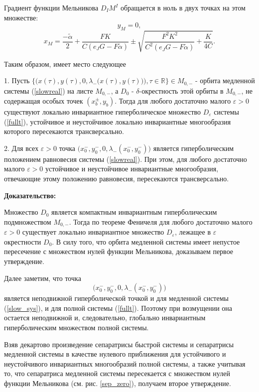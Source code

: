 Градиент функции Мельникова $D_IM^I$ обращается в ноль в двух точках на этом множестве:
$$y_M = 0,$$
$$x_M = \frac{-\tilde \alpha}{2}+\frac{FK}{C(e_JG-F \tilde \alpha)} \pm \sqrt{\frac{F^2 K^2}{C^2(e_JG-F \tilde \alpha)}+\frac{K}{4C}}.$$

Таким образом, имеет место следующее
\begin{utv}


1. Пусть $\{\Big( x(\tau), y(\tau), 0, \lambda_{-} \big(x(\tau), y(\tau) \big) \Big), \tau\in \mathbb{R}\} \in M_{0,-}$ - орбита медленной системы (\ref{slowreal}) на листе $M_{0,-}$, 
а $D_0$ -  $\delta$-окрестность этой орбиты в $M_{0,-}$, не содержащая особых точек $(x_{b}^{\pm}, y_{b})$. Тогда для любого достаточно малого $\varepsilon > 0$ существуют локально инвариантное гиперболическое множество $D_\varepsilon$ системы (\ref{fullt}), устойчивое и неустойчивое локально инвариантные многообразия которого пересекаются трансверсально.

2. Для всех $\varepsilon>0$ точка $\big( x_{0}^{-}, y_{0}^{-}, 0, \lambda_{-}(x_{0}^{-}, y_{0}^{-}) \big)$ является гиперболическим положением равновесия системы (\ref{slowreal}).
При этом, для любого достаточно малого $\varepsilon > 0$ устойчивое и неустойчивое инвариантные многообразия, отвечающие этому положению равновесия, пересекаются трансверсально.
\end{utv}
\textbf{Доказательство:}

Множество $D_0$ является компактным инвариантным гиперболическим подмножеством $M_{0,-}$. Тогда по теореме Феничеля для любого достаточно малого $\varepsilon > 0$ существует локально инвариантное множество $D_\varepsilon$, лежащее в $\varepsilon$ окрестности $D_0$. В силу того, что орбита медленной системы имеет непустое пересечение с множеством нулей функции Мельникова, доказываем первое утверждение.

Далее заметим, что точка
$$\big(x_{0}^{-}, y_{0}^{-}, 0, \lambda_{-}(x_{0}^{-}, y_{0}^{-}) \big)$$
является неподвижной гиперболической точкой и для медленной системы (\ref{slow_sys}), и для полной системы (\ref{fullt}). Поэтому при возмущении она остается неподвижной и, следовательно, глобально инвариантным гиперболическим множеством полной системы.

Взяв декартово произведение сепаратрисы быстрой системы и сепаратрисы медленной системы в качестве нулевого приближения для устойчивого и неустойчивого инвариантных многообразий полной системы, а также учитывая то, что сепаратриса медленной системы пересекается с множеством нулей функции Мельникова (см. рис. \ref{sep_zero}), получаем второе утверждение. 

